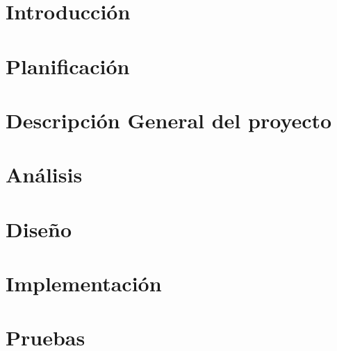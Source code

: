 \documentclass[a4paper,11pt]{book}
\begin{document}
\renewcommand{\figurename}{Figura}
\renewcommand{\listfigurename}{Índice de figuras}
\renewcommand{\tablename}{Tabla}
\renewcommand{\listtablename}{Índice de tablas}

\renewcommand{\appendixname}{Apéndice}
\renewcommand{\appendixtocname}{Apéndices}
\renewcommand{\appendixpagename}{Apéndices}

\pagestyle{empty}

\cleardoublepage


\cleardoublepage
\pagestyle{plain}

\frontmatter %


\cleardoublepage

\tableofcontents
\listoffigures
\listoftables

\mainmatter %

\chapter{Introducción}
\label{cap:introduccion}



\chapter{Planificación}
\label{cap:planificacion}


\chapter{Descripción General del proyecto}
\label{cap:descripcion}


\chapter{Análisis}
\label{cap:analisis}


\chapter{Diseño}
\label{cap:diseño}


\chapter{Implementación}
\label{cap:implementacion}


\chapter{Pruebas}
\label{cap:pruebas}

\end{document}
